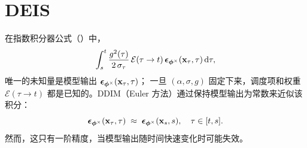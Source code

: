 



\clearpage
\newpage



\section{\texorpdfstring{DEIS}{DEIS}}\label{sec:exponential}
在指数积分器公式（）中，
\[
\int_{s}^{t}
\frac{g^2(\tau)}{2\,\sigma_\tau}\,
\mathcal{E}(\tau \to  t)\,
{\bm{\epsilon}}_{\bm{\phi}^\times}({\mathbf{x}}_\tau,\tau)\mathop{}\!\mathrm{d}\tau,
\]
唯一的未知量是模型输出 ${\bm{\epsilon}}_{\bm{\phi}^\times}({\mathbf{x}}_\tau,\tau)$；
一旦 $(\alpha,\sigma,g)$ 固定下来，调度项和权重 $\mathcal{E}(\tau \to  t)$ 都是已知的。DDIM（Euler 方法）通过保持模型输出为常数来近似该积分：
\[
{\bm{\epsilon}}_{\bm{\phi}^\times}({\mathbf{x}}_\tau,\tau)\;\approx\;{\bm{\epsilon}}_{\bm{\phi}^\times}({\mathbf{x}}_s,s),\quad \tau\in[t,s].
\]
然而，这只有一阶精度，当模型输出随时间快速变化时可能失效。


